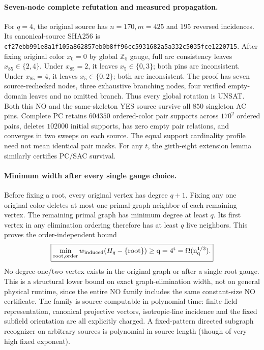 \documentclass[11pt]{article}
\begin{document}
\paragraph{Seven-node complete refutation and measured propagation.}
For $q=4$, the original source has $n=170,m=425$ and $195$
reversed incidences. Its canonical-source SHA256 is
\texttt{cf27ebb991e8a1f105a862857eb0b8ff96cc5931682a5a332c5035fce1220715}.
After fixing original color $x_0=0$ by global $\mathbb Z_5$ gauge,
full arc consistency leaves $x_{85}\in\{2,4\}$.
Under $x_{85}=2$, it leaves $x_5\in\{0,3\}$;
both pins are inconsistent. Under $x_{85}=4$, it leaves
$x_5\in\{0,2\}$; both are inconsistent. The proof has
seven source-rechecked nodes, three exhaustive branching nodes,
four verified empty-domain leaves and no omitted branch.
Thus every global rotation is UNSAT. Both this NO and the
same-skeleton YES source survive all $850$ singleton AC pins.
Complete PC retains $604350$ ordered-color pair supports across
$170^2$ ordered pairs, deletes $102000$ initial supports,
has zero empty pair relations, and converges in two sweeps on
each source. The equal support cardinality profile need not
mean identical pair masks. For any $t$, the girth-eight
extension lemma similarly certifies PC/SAC survival.

\paragraph{Minimum width after every single gauge choice.}
Before fixing a root, every original vertex has degree $q+1$.
Fixing any one original color deletes at most one primal-graph
neighbor of each remaining vertex. The remaining primal graph
has minimum degree at least $q$. Its first vertex in any
elimination ordering therefore has at least $q$ live neighbors.
This proves the order-independent bound
\[
\boxed{\min_{\rm root,order}w_{\rm induced}(H_q-\{\rm root\})
       \ge q=4^t=\Omega(n_q^{1/3}).}
\]
No degree-one/two vertex exists in the original graph or after a
single root gauge. This is a structural lower bound on exact
graph-elimination width, not on general physical runtime, since
the entire NO family includes the same constant-size NO
certificate. The family is source-computable in polynomial
time: finite-field representation, canonical projective vectors,
isotropic-line incidence and the fixed subfield orientation
are all explicitly charged. A fixed-pattern directed
subgraph recognizer on arbitrary sources is polynomial in
source length (though of very high fixed exponent).
\end{document}
